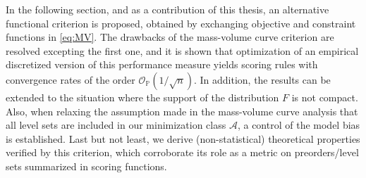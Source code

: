 In the following section, and as a contribution of this thesis, an alternative functional criterion is proposed, obtained by exchanging objective and constraint functions in \eqref{eq:MV}. The drawbacks of the mass-volume curve criterion are resolved excepting the first one, and it is shown that optimization of an empirical discretized version of this performance measure yields scoring rules with convergence rates of the order $\mathcal{O}_{\mathbb{P}}(1/\sqrt{n})$. In addition, the results can be extended to the situation where the support of the distribution $F$ is not compact. Also, when relaxing the assumption made in the mass-volume curve analysis that all level sets are included in our minimization class $\mathcal{A}$, a control of the model bias is established. Last but not least, we derive (non-statistical) theoretical properties verified by this criterion, which corroborate its role as a metric on preorders/level sets summarized in scoring functions.


